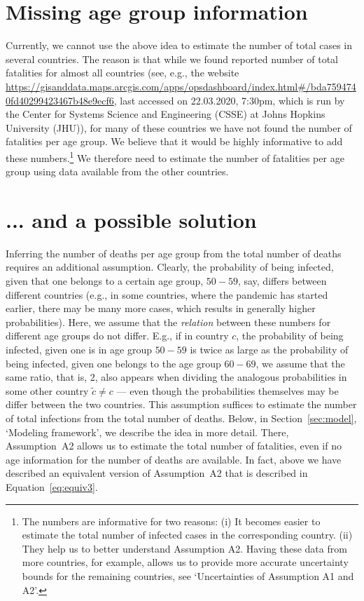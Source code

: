 \documentclass[a4paper]{article}
\begin{document}
\section{Missing age group information} \label{sec:noage}
Currently, we cannot use the above idea to 
estimate the number of total cases in 
several countries. The reason is that 
while we found reported number of total fatalities 
for almost all countries 
(see, e.g., the website {\footnotesize
\url{https://gisanddata.maps.arcgis.com/apps/opsdashboard/index.html#/bda7594740fd40299423467b48e9ecf6}},
last accessed on 22.03.2020, 7:30pm,
which is run by the Center for Systems Science and Engineering ({CSSE}) at Johns Hopkins University ({JHU})), 
for many of these countries we have not found the number of fatalities per age group. 
We believe that it would be highly informative to add these numbers.\footnote{The numbers 
are informative for two reasons: (i) It
becomes easier to estimate the 
total number of infected cases in the 
corresponding country.
(ii) They help us to better understand Assumption A2. Having these data from 
more countries, for example, 
allows us to 
provide more accurate uncertainty bounds for 
the remaining countries, see `Uncertainties of Assumption A1 and A2'.}
We therefore need to estimate the number of fatalities per age group using data available from the other countries.


\section{... and a possible solution}
Inferring the number of deaths per age group from the total number of deaths requires an additional assumption. 
Clearly, 
the probability of
being infected, given that one 
belongs to a certain age group, $50-59$, say, 
differs between different countries (e.g., in some countries, 
where the pandemic has started earlier, there may be many more cases, which results in generally higher probabilities).
Here, we assume that the \emph{relation} between these numbers for different age groups do not differ.
E.g., if 
in country $c$, the
probability of being infected, given one is in age group $50-59$
is twice as large as the probability of being infected, given 
one belongs to the age group $60-69$, 
we assume that the same ratio, that is, 2, 
also appears when dividing the analogous probabilities in some other country $\tilde{c} \neq c$ --- even though the probabilities themselves may be differ between the two countries. 
This assumption suffices to estimate the number of total infections
from the total number of deaths.
Below, in Section~\ref{sec:model}, `Modeling framework', we describe the idea in more detail. 
There, Assumption~A2 allows us to 
estimate the total number of fatalities, even if 
no age information for the number of deaths are available.
In fact, above we have described an equivalent version of Assumption~A2 that is described in Equation~\eqref{eq:equiv3}.
\end{document}
